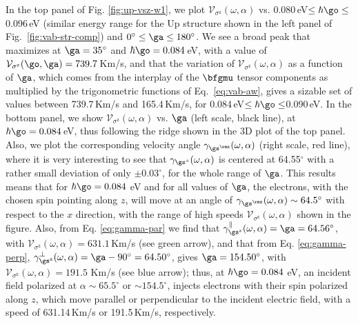 \documentclass[floatfix,prb,aps,superscriptaddress,showpacs,11pt,preprint,letterpaper]{revtex4}
\begin{document}
In the top panel of Fig. \ref{fig:up-vsz-w1}, we plot
$\mathcal{V}_{\sigma^{\mathrm{z}}} (\omega,\alpha)$ vs.
0.080\,eV$\leq\hbar\go\leq$0.096\,eV (similar energy range for the Up
structure shown in the left panel of Fig.~\ref{fig:vab-str-comp}) and
$0^\circ\leq\ga\leq 180^\circ$.
% 
We see a broad peak that maximizes at $\ga=35^{\circ}$ and $\hbar\go=
0.084$\,eV, with a value of $\mathcal{V}_{\sigma^{\mathrm{z}}}(\go,\ga) =
739.7$\,Km/s, and that the variation of $\mathcal{V}_{\sigma^{\mathrm{z}}}
(\omega,\alpha)$ as a function of $\ga$, which comes from the interplay of the
$\bfgmu$ tensor components as multiplied by the  trigonometric functions of
Eq.~\eqref{eq:vab-aw}, gives a sizable set of values between 739.7\,Km/s and
165.4\,Km/s, for 0.084\,eV$\leq\hbar\go\leq$0.090\,eV. 
% 
In the bottom panel, we show $\mathcal{V}_{\sigma^{\mathrm{z}}}
(\omega,\alpha)$ vs. $\ga$ (left scale, black line), at $\hbar\go= 0.084$\,eV,
thus following the ridge shown in the 3D plot of the top panel. 
Also,
we plot the
corresponding velocity angle $\gamma_{\gs^\rmz}(\omega,\alpha)$
(right scale, red line),
where it is very interesting to see that $\gamma_{\gs^z}(\omega,\alpha)$ is centered
at 64.55$^\circ$ with a rather small deviation of only $\pm 0.03^\circ$,
for the whole range of $\ga$. This results means that for $\hbar\go=0.084$ eV
and for all values of $\ga$, the electrons, with the chosen spin pointing along
$z$, will move at an angle of $\gamma_{\gs^\rmz}(\omega,\alpha) \sim
64.5^{\circ}$ with respect to the $x$ direction, with the range of  high
speeds $\mathcal{V}_{\sigma^{\mathrm{z}}} (\omega,\alpha)$ shown in the figure.
% 
Also, from Eq. \eqref{eq:gamma-par} we find that
$\gamma^\parallel_{\gs^\mathrm{z}} (\omega,\alpha)=\ga = 64.56^\circ$, with
$\mathcal{V}_{\sigma^{\mathrm{z}}} (\omega,\alpha) = 631.1$\,Km/s (see green
arrow), and that from Eq. \eqref{eq:gamma-perp},
$\gamma^\perp_{\gs^\mathrm{z}}(\omega,\alpha)=\ga-90^\circ=64.50^\circ$,
gives $\ga=154.50^\circ$, with
$\mathcal{V}_{\sigma^{\mathrm{z}}}(\omega,\alpha) = 191.5$ Km/s (see blue
arrow); thus, at $\hbar\go=0.084$ eV, an incident field polarized at $\alpha
\sim 65.5^\circ$ or $\sim 154.5^\circ$, injects electrons with their spin
polarized along $z$, which move parallel or perpendicular to the incident
electric field,  with a speed of 631.14\,Km/s or 191.5\,Km/s, respectively.
\end{document}

